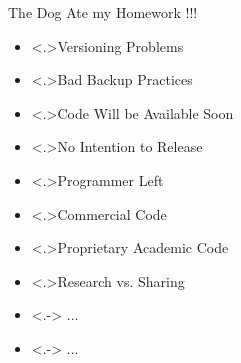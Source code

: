 \documentclass[xcolor=x11names,compress,8pt]{beamer}
\renewcommand{\(}{\begin{columns}}
\renewcommand{\)}{\end{columns}}
\newcommand{\<}[1]{\begin{column}{#1}}
\renewcommand{\>}{\end{column}}
\begin{document}
\begin{frame}[label=sec-1-0-4]{The Dog Ate my Homework !!! }
  \vspace{-.4cm}
  \begin{multicols}{2}
    \begin{itemize}[<+->]
    \item \alert<.>{Versioning Problems}
    \item \alert<.>{Bad Backup Practices}
    \item \alert<.>{Code Will be Available Soon}
    \item \alert<.>{No Intention to Release}
    \item \alert<.>{Programmer Left}
    \item \alert<.>{Commercial Code}
    \item \alert<.>{Proprietary Academic Code}
    \item \alert<.>{Research vs. Sharing}
    \item<.-> ...
    \item<.-> ...
    \end{itemize}
  \end{multicols}


\end{frame}
\end{document}
